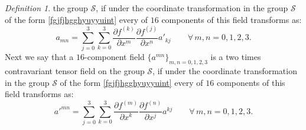 \documentclass{article}
\theoremstyle{definition}
\newtheorem{definition}{Definition}[section]
\theoremstyle{remark}
\newcommand{\er}{\eqref}
\newcommand{\er}{\eqref}
\newtheorem{definition}{Definition}
\begin{document}
\begin{definition}
the group $\mathcal{S}$, if under the coordinate transformation in
the group $\mathcal{S}$ of the form \er{fgjfjhgghyuyyuint} every of
$16$ components of this field transforms as:
\begin{equation}\label{fgjfjhgghhgjghjhjkkkkjjkint}
a_{mn}=\sum_{j=0}^{3}\sum_{k=0}^{3}\frac{\partial f^{(k)}}{\partial
x^m}\frac{\partial f^{(j)}}{\partial x^n}a'_{kj}\quad\quad\forall\,
m,n=0,1,2,3.
\end{equation}
Next we say that a $16$-component field $\{a^{mn}\}_{m,n=0,1,2,3}$
is a two times contravariant tensor field on the group
$\mathcal{S}$, if under the coordinate transformation in the group
$\mathcal{S}$ of the form \er{fgjfjhgghyuyyuint} every of $16$
components of this field transforms as:
\begin{equation}\label{fgjfjhgghhgjghjhjkkkkggghint}
a'^{mn}=\sum_{j=0}^{3}\sum_{k=0}^{3}\frac{\partial f^{(m)}}{\partial
x^k}\frac{\partial f^{(n)}}{\partial x^j}a^{kj}\quad\quad\forall\,
m,n=0,1,2,3.
\end{equation}
%
%
%
\begin{comment}
Then it is well known that for every two four-vectors
$(a^0,a^1,a^2,a^3)$ and $(b^0,b^1,b^2,b^3)$ on $\mathcal{S}$, the
$16$-component field $\{c^{mn}\}_{m,n=0,1,2,3}$, defined in every
coordinate system by
\begin{equation}\label{fgjfjhgghhgjghjhjkkkkgjghghjljlint}
c^{mn}:=a^mb^n\quad\quad\forall\, m,n=0,1,2,3,
\end{equation}
is a two times contravariant tensor on $\mathcal{S}$. Moreover, for
every two four-covectors $(a_0,a_1,a_2,a_3)$ and $(b_0,b_1,b_2,b_3)$
on $\mathcal{S}$, the $16$-component field
$\{c_{mn}\}_{m,n=0,1,2,3}$, defined in every coordinate system by
\begin{equation}\label{fgjfjhgghhgjghjhjkkkkgjghghkkkjint}
c_{mn}:=a_mb_n\quad\quad\forall\, m,n=0,1,2,3,
\end{equation}
is a two times covariant tensor on $\mathcal{S}$. It is also well
known that if $\{a^{mn}\}_{m,n=0,1,2,3}$ is a two times
contravariant tensor field on the group $\mathcal{S}$ and if a
$16$-component field $\{b_{mn}\}_{m,n=0,1,2,3}$ satisfies
\begin{equation}\label{fgjfjhgghhgjghjhjkkkkgjghghuiiiuint}
\sum_{k=0}^{3}a^{mk}b_{kn}=\begin{cases}
1\quad\text{if}\quad m=n\\
0\quad\text{if}\quad m\neq n
\end{cases}\quad\quad\forall\, m,n=0,1,2,3,
\end{equation}

\end{comment}
\end{definition}
\end{document}
